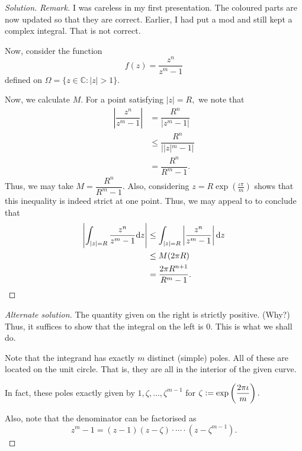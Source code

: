 \documentclass[12pt]{article}
\theoremstyle{definition}
\newenvironment{soln}{\begin{proof}[Solution]}{\end{proof}}
\begin{document}
\begin{enumerate}[leftmargin=*]
\begin{soln}
		{\color{myupdatecolor}\emph{Remark.} I was careless in my first presentation. The coloured parts are now updated so that they are correct. Earlier, I had put a mod and still kept a complex integral. That is not correct.}

		Now, consider the function
		\begin{equation*} 
			f(z) = \dfrac{z^n}{z^m - 1}
		\end{equation*}
		defined on $\Omega = \{z \in \mathbb{C} : |z| > 1\}.$

		Now, we calculate $M.$ For a point satisfying $|z| = R,$ we note that
		\begin{align*} 
			\left|\dfrac{z^n}{z^m - 1}\right| &= \dfrac{R^n}{|z^m - 1|}\\
			&\le \dfrac{R^n}{||z|^m - 1|}\\
			&= \dfrac{R^n}{R^m - 1}.
		\end{align*}
		Thus, we may take $M = \dfrac{R^n}{R^m - 1}.$ Also, considering $z = R\exp\left(\frac{\iota\pi}{m}\right)$ shows that this inequality is indeed strict at one point. Thus, we may appeal to  to conclude that
		\begin{align*} 
			\left|\int_{|z| = R}^{} \dfrac{z^n}{z^m - 1} {\mathrm{d}}z\right| &\le \int_{|z| = R}^{} \left|\dfrac{z^n}{z^m - 1}\right| {\mathrm{d}}z\\
			&\le M(2\pi R)\\
			&= \dfrac{2\pi R^{n + 1}}{R^{m} - 1}. \qedhere
		\end{align*}
	\end{soln}

	\begin{proof}[Alternate solution]
		The quantity given on the right is strictly positive. (Why?)\\
		Thus, it suffices to show that the integral on the left is $0.$ This is what we shall do.

		Note that the integrand has exactly $m$ distinct (simple) poles. All of these are located on the unit circle. That is, they are all in the interior of the given curve.

		In fact, these poles exactly given by $1, \zeta, \ldots, \zeta^{m-1}$ for $\zeta\vcentcolon=\exp\left(\dfrac{2\pi\iota}{m}\right).$

		Also, note that the denominator can be factorised as
		\begin{equation*} 
			z^m - 1 = (z - 1)(z - \zeta)\cdot\cdots\cdot(z - \zeta^{m-1}).
		\end{equation*}


\end{proof}
\end{enumerate}
\end{document}
